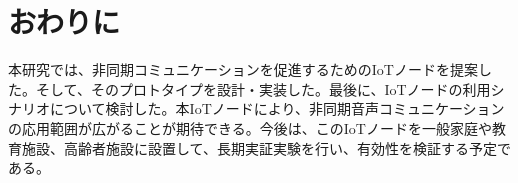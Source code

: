 \documentclass[submit,techrep,noauthor]{ipsj}
\begin{document}
\section{おわりに}
本研究では、非同期コミュニケーションを促進するためのIoTノードを提案した。そして、そのプロトタイプを設計・実装した。最後に、IoTノードの利用シナリオについて検討した。本IoTノードにより、非同期音声コミュニケーションの応用範囲が広がることが期待できる。今後は、このIoTノードを一般家庭や教育施設、高齢者施設に設置して、長期実証実験を行い、有効性を検証する予定である。



 
\end{document}
